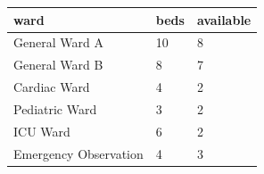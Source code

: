 {\scriptsize\setlength{\tabcolsep}{3pt}\begin{tabular}{lll}\toprule
\textbf{ward} & \textbf{beds} & \textbf{available} \\\midrule
General Ward A & 10 & 8 \\
General Ward B & 8 & 7 \\
Cardiac Ward & 4 & 2 \\
Pediatric Ward & 3 & 2 \\
ICU Ward & 6 & 2 \\
Emergency Observation & 4 & 3 \\
\bottomrule\end{tabular}}
